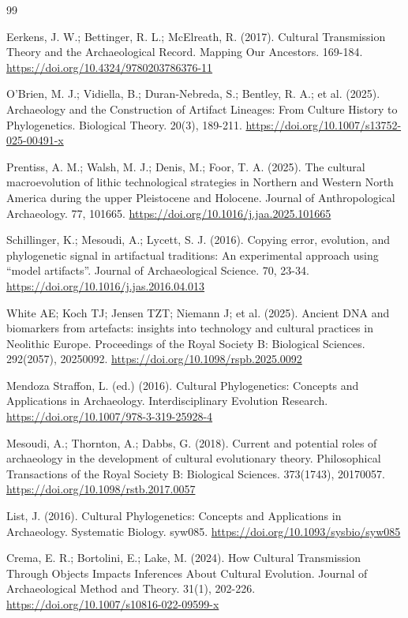 \documentclass[11pt]{article}
\begin{document}
\begin{thebibliography}{99}
\sloppy

Eerkens, J. W.; Bettinger, R. L.; McElreath, R. (2017). Cultural Transmission Theory and the Archaeological Record. Mapping Our Ancestors. 169-184. \url{https://doi.org/10.4324/9780203786376-11}

O'Brien, M. J.; Vidiella, B.; Duran-Nebreda, S.; Bentley, R. A.; et al. (2025). Archaeology and the Construction of Artifact Lineages: From Culture History to Phylogenetics. Biological Theory. 20(3), 189-211. \url{https://doi.org/10.1007/s13752-025-00491-x}

Prentiss, A. M.; Walsh, M. J.; Denis, M.; Foor, T. A. (2025). The cultural macroevolution of lithic technological strategies in Northern and Western North America during the upper Pleistocene and Holocene. Journal of Anthropological Archaeology. 77, 101665. \url{https://doi.org/10.1016/j.jaa.2025.101665}

Schillinger, K.; Mesoudi, A.; Lycett, S. J. (2016). Copying error, evolution, and phylogenetic signal in artifactual traditions: An experimental approach using ``model artifacts''. Journal of Archaeological Science. 70, 23-34. \url{https://doi.org/10.1016/j.jas.2016.04.013}

White AE; Koch TJ; Jensen TZT; Niemann J; et al. (2025). Ancient DNA and biomarkers from artefacts: insights into technology and cultural practices in Neolithic Europe. Proceedings of the Royal Society B: Biological Sciences. 292(2057), 20250092. \url{https://doi.org/10.1098/rspb.2025.0092}

Mendoza Straffon, L. (ed.) (2016). Cultural Phylogenetics: Concepts and Applications in Archaeology. Interdisciplinary Evolution Research. \url{https://doi.org/10.1007/978-3-319-25928-4}

Mesoudi, A.; Thornton, A.; Dabbs, G. (2018). Current and potential roles of archaeology in the development of cultural evolutionary theory. Philosophical Transactions of the Royal Society B: Biological Sciences. 373(1743), 20170057. \url{https://doi.org/10.1098/rstb.2017.0057}

List, J. (2016). Cultural Phylogenetics: Concepts and Applications in Archaeology. Systematic Biology. syw085. \url{https://doi.org/10.1093/sysbio/syw085}

Crema, E. R.; Bortolini, E.; Lake, M. (2024). How Cultural Transmission Through Objects Impacts Inferences About Cultural Evolution. Journal of Archaeological Method and Theory. 31(1), 202-226. \url{https://doi.org/10.1007/s10816-022-09599-x}


\end{thebibliography}
\end{document}
